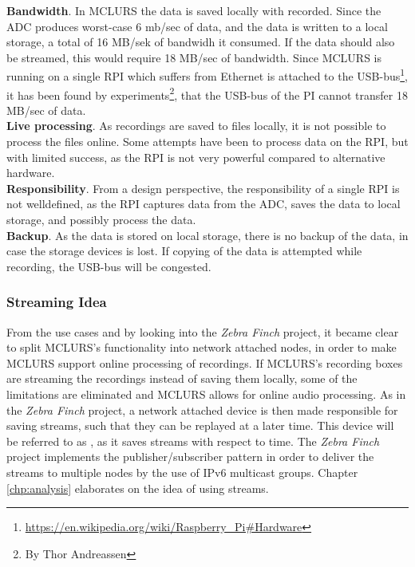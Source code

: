 \textbf{Bandwidth}. In MCLURS the data is saved locally with recorded. Since the ADC produces worst-case 6 mb/sec of data, and the data is written to a local storage, a total of 16 MB/sek of bandwidh it consumed. If the data should also be streamed, this would require 18 MB/sec of bandwidth. Since MCLURS is running on a single RPI which suffers from Ethernet is attached to the USB-bus\footnote{\url{https://en.wikipedia.org/wiki/Raspberry\_Pi\#Hardware}}, it has been found by experiments\footnote{By Thor Andreassen}, that the USB-bus of the PI cannot transfer 18 MB/sec of data.\\

\textbf{Live processing}. As recordings are saved to files locally, it is not possible to process the files online. Some attempts have been to process data on the RPI, but with limited success, as the RPI is not very powerful compared to alternative hardware. \\

\textbf{Responsibility}. From a design perspective, the responsibility of a single RPI is not welldefined, as the RPI captures data from the ADC, saves the data to local storage, and possibly process the data. \\

\textbf{Backup}. As the data is stored on local storage, there is no backup of the data, in case the storage devices is lost. If copying of the data is attempted while recording, the USB-bus will be congested.

 
 
\subsubsection{Streaming Idea} \label{sec:streamingidea}
From the use cases and by looking into the \textit{Zebra Finch}\citep{larsen2016system} project, it became clear to split MCLURS's functionality into network attached nodes, in order to make MCLURS support online processing of recordings. If MCLURS's recording boxes are streaming the recordings instead of saving them locally, some of the limitations are eliminated and MCLURS allows for online audio processing. As in the \textit{Zebra Finch} project, a network attached device is then made responsible for saving streams, such that they can be replayed at a later time. This device will be referred to as , as it saves streams with respect to time. The \textit{Zebra Finch} project implements the publisher/subscriber pattern in order to deliver the streams to multiple nodes by the use of IPv6 multicast groups. 
Chapter \ref{chp:analysis} elaborates on the idea of using streams.\\


